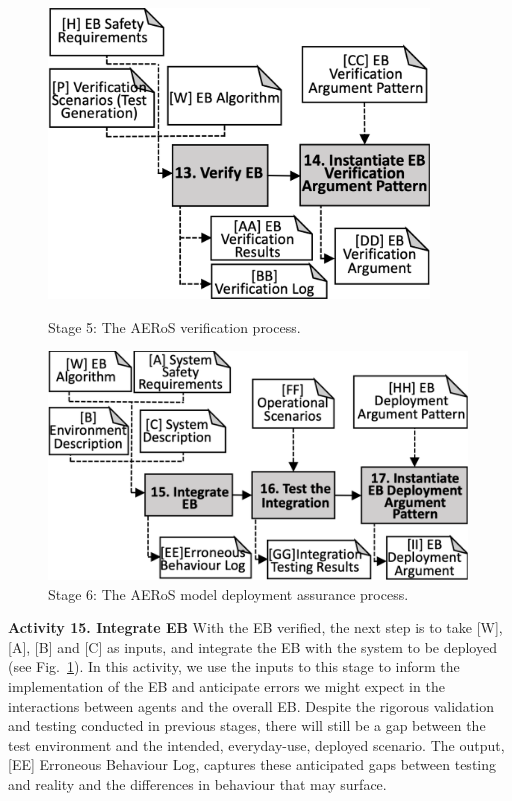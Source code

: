 \documentclass[runningheads]{llncs}
\begin{document}
\begin{figure}[!t]
\centering
\begin{minipage}[b]{.47\textwidth}
	\centering
	\includegraphics[width=0.9\textwidth]{figures/AERoS-Stage5.pdf}    
	\vspace{-2ex}
	\caption{Stage 5: The AERoS verification process.}
	\label{amlas-a-stage5}
\end{minipage}%
\hspace*{0.01\textwidth}
\begin{minipage}[b]{.5\textwidth}
	\centering
	\includegraphics[width=0.99\textwidth]{figures/AERoS-Stage6.pdf}
	\vspace{-2ex}
	\caption{Stage 6: The AERoS model deployment assurance process.}
	\label{amlas-a-stage6}
\end{minipage}
\vspace{-4ex}
\end{figure} 
\noindent\textbf{Activity 15. Integrate EB} With the EB verified, the next step is to take [W], [A], [B] and [C] as inputs, and integrate the EB with the system to be deployed (see Fig.~\ref{amlas-a-stage6}). In this activity, we use the inputs to this stage to inform the implementation of the EB and anticipate errors we might expect in the interactions between agents and the overall EB. Despite the rigorous validation and testing conducted in previous stages, there will still be a gap between the test environment and the intended, everyday-use, deployed scenario. The output, [EE] Erroneous Behaviour Log, captures these anticipated gaps between testing and reality and the differences in behaviour that may surface. 
\end{document}
